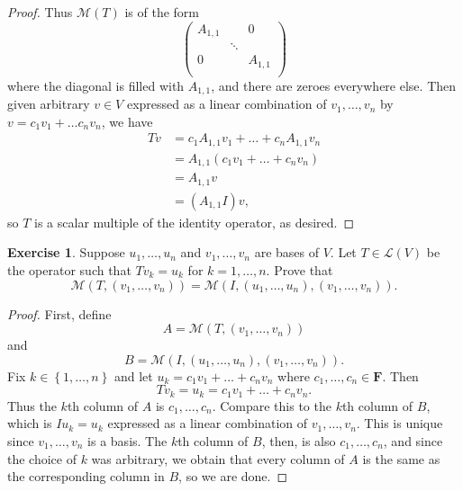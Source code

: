 \documentclass{article}
\theoremstyle{definition}
\newtheorem{ex}{Exercise}
\begin{document}
\begin{proof}
	Thus $\mathcal{M}(T)$ is of the form \begin{equation*}
		\begin{pmatrix}
			A_{1, 1} &        & 0        \\
			         & \ddots &          \\
			0        &        & A_{1, 1} \\
		\end{pmatrix}
	\end{equation*}
	where the diagonal is filled with $A_{1, 1}$, and there are zeroes everywhere else.
	Then given arbitrary $v \in V$ expressed as a linear combination of $v_1, \dots, v_n$ by $v = c_1v_1 + \dots c_nv_n$, we have \begin{align*}
		Tv & = c_1A_{1, 1}v_1 + \dots + c_nA_{1, 1}v_n \\
		   & = A_{1, 1}(c_1v_1 + \dots + c_nv_n)       \\
		   & = A_{1, 1}v                               \\
		   & = (A_{1, 1}I)v,
	\end{align*}
	so $T$ is a scalar multiple of the identity operator, as desired.
\end{proof}

\begin{ex}
	Suppose $u_1, \dots, u_n$ and $v_1, \dots, v_n$ are bases of $V$.
	Let $T \in \mathcal{L}(V)$ be the operator such that $Tv_k = u_k$ for $k = 1, \dots, n$.
	Prove that \begin{equation*}
		\mathcal{M}\left( T, (v_1, \dots, v_n) \right) = \mathcal{M}\left( I, (u_1, \dots, u_n), (v_1, \dots, v_n) \right).
	\end{equation*}
\end{ex}
\begin{proof}
	First, define \begin{equation*}
		A = \mathcal{M}\left( T, (v_1, \dots, v_n) \right)
	\end{equation*}
	and \begin{equation*}
		B = \mathcal{M}\left( I, (u_1, \dots, u_n), (v_1, \dots, v_n) \right).
	\end{equation*}
	Fix $k \in \left\lbrace 1, \dots, n \right\rbrace$ and let $u_k = c_1v_1 + \dots + c_nv_n$ where $c_1,\dots,c_n \in \mathbf{F}$.
	Then \begin{equation*}
		Tv_k = u_k = c_1v_1 + \dots + c_nv_n.
	\end{equation*}
	Thus the $k$th column of $A$ is $c_1, \dots, c_n$.
	Compare this to the $k$th column of $B$, which is $Iu_k = u_k$ expressed as a linear combination of $v_1, \dots, v_n$.
	This is unique since $v_1, \dots, v_n$ is a basis.
	The $k$th column of $B$, then, is also $c_1, \dots, c_n$, and since the choice of $k$ was arbitrary, we obtain that every column of $A$ is the same as the corresponding column in $B$, so we are done.
\end{proof}
\end{document}
